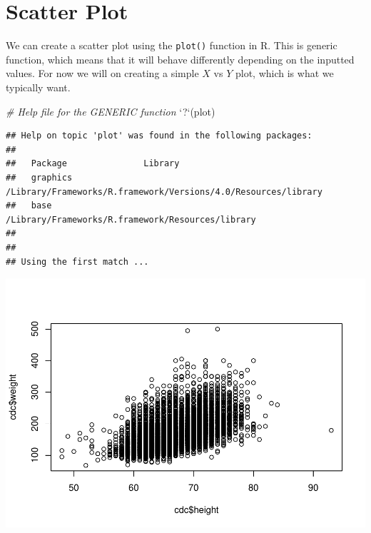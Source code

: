 \documentclass[
]{book}
\newenvironment{Shaded}{\begin{snugshade}}{\end{snugshade}}
\newcommand{\CommentTok}[1]{\textcolor[rgb]{0.56,0.35,0.01}{\textit{#1}}}
\newcommand{\DataTypeTok}[1]{\textcolor[rgb]{0.13,0.29,0.53}{#1}}
\newcommand{\KeywordTok}[1]{\textcolor[rgb]{0.13,0.29,0.53}{\textbf{#1}}}
\newcommand{\NormalTok}[1]{#1}
\newcommand{\OperatorTok}[1]{\textcolor[rgb]{0.81,0.36,0.00}{\textbf{#1}}}
\newcommand{\StringTok}[1]{\textcolor[rgb]{0.31,0.60,0.02}{#1}}
\begin{document}
\hypertarget{scatter-plot}{%
\section{Scatter Plot}\label{scatter-plot}}

We can create a scatter plot using the \texttt{plot()} function in R. This is generic function, which means that it will behave differently depending on the inputted values. For now we will on creating a simple \(X\) vs \(Y\) plot, which is what we typically want.

\begin{Shaded}
\begin{Highlighting}[]
\CommentTok{# Help file for the GENERIC function}
\StringTok{`}\DataTypeTok{?}\StringTok{`}\NormalTok{(plot)}
\end{Highlighting}
\end{Shaded}

\begin{verbatim}
## Help on topic 'plot' was found in the following packages:
## 
##   Package               Library
##   graphics              /Library/Frameworks/R.framework/Versions/4.0/Resources/library
##   base                  /Library/Frameworks/R.framework/Resources/library
## 
## 
## Using the first match ...
\end{verbatim}

\begin{Shaded}
\end{Shaded}

\includegraphics{_main_files/figure-latex/unnamed-chunk-179-1.pdf}
\end{document}
